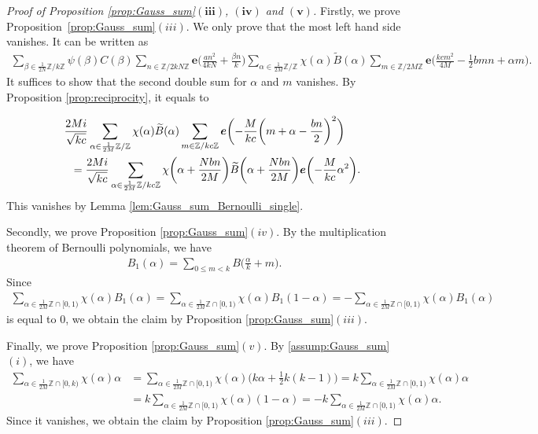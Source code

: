 \documentclass[11pt]{article}
\numberwithin{equation}{section}
\newcommand{\Z}{\mathbb{Z}}
\numberwithin{equation}{section}
\begin{document}
\begin{proof}[Proof of Proposition \ref{prop:Gauss_sum}${\boldsymbol{(iii)}}$, $\boldsymbol{(iv)}$ and $\boldsymbol{(v)}$]
	Firstly, we prove Proposition~\ref{prop:Gauss_sum}$(iii)$.
	We on\-ly prove that the most left hand side vanishes.
	It can be written as
	\begin{gather*}
		\sum_{\beta \in \frac{1}{2N}\Z/k\Z}\!\!\!\! \psi(\beta) C(\beta)\!\!\!
		\sum_{n \in \Z/2kN\Z}\!\!\! \!\bm{e}\bigg( \frac{an^2}{4kN} + \frac{\beta n}{k} \bigg)
	\!\!\!\sum_{\alpha \in \frac{1}{2M}\Z/\Z}\!\!\! \!\chi(\alpha) \widetilde{B}(\alpha)\!\!\!
\sum_{m \in \Z/2M\Z}\!\!\!\!\bm{e}\bigg( \frac{kcm^2}{4M} - \frac{1}{2}bmn + \alpha m \bigg).
	\end{gather*}
	It suffices to show that the second double sum for $ \alpha $ and $ m $ vanishes.
	By Proposition \ref{prop:reciprocity}, it equals to
	{\samepage\begin{gather*}
\frac{2M{\rm i}}{\sqrt{kc}}
		\sum_{\alpha \in \frac{1}{2M}\Z/\Z} \chi(\alpha) \widetilde{B}(\alpha)
		\sum_{m \in \Z/kc\Z} \bm{e}\bigg({-}\frac{M}{kc} \bigg( m + \alpha - \frac{bn}{2} \bigg)^2 \bigg)
\\ \qquad
	{}=	\frac{2M{\rm i}}{\sqrt{kc}}
		\sum_{\alpha \in \frac{1}{2M}\Z/kc\Z} \chi\bigg(\alpha + \frac{Nbn}{2M} \bigg) \widetilde{B}\bigg(\alpha + \frac{Nbn}{2M} \bigg)
		\bm{e}\bigg({-}\frac{M}{kc} \alpha^2 \bigg).
	\end{gather*}
	This vanishes by Lemma \ref{lem:Gauss_sum_Bernoulli_single}.

}
	
	Secondly, we prove Proposition \ref{prop:Gauss_sum}$(iv)$.
	By the multiplication theorem of Bernoulli polynomials, we have
	\begin{gather*}
	B_1(\alpha) = \sum_{0 \le m < k} B\bigg( \frac{\alpha}{k} + m \bigg).
	\end{gather*}
	Since
	\begin{gather*}
	\sum_{\alpha \in \frac{1}{2M}\Z \cap [0, 1)} \chi(\alpha) B_1(\alpha)
	= \sum_{\alpha \in \frac{1}{2M}\Z \cap [0, 1)} \chi(\alpha) B_1(1-\alpha)
	= -\sum_{\alpha \in \frac{1}{2M}\Z \cap [0, 1)} \chi(\alpha) B_1(\alpha)
	\end{gather*}
	is equal to $ 0 $, we obtain the claim by Proposition \ref{prop:Gauss_sum}$(iii)$.
	
	Finally, we prove Proposition \ref{prop:Gauss_sum}$(v)$.
	By \ref{assump:Gauss_sum}$(i)$, we have
	\begin{align*}
		\sum_{\alpha \in \frac{1}{2M}\Z \cap [0, k)} \chi(\alpha) \alpha		&=
\sum_{\alpha \in \frac{1}{2M}\Z \cap [0, 1)} \chi(\alpha) \bigg( k\alpha + \frac{1}{2}k(k-1) \bigg)
		= 		k \sum_{\alpha \in \frac{1}{2M}\Z \cap [0, 1)} \chi(\alpha) \alpha
\\
		&= k \sum_{\alpha \in \frac{1}{2M}\Z \cap [0, 1)} \chi(\alpha) ( 1 - \alpha )
		= -k \sum_{\alpha \in \frac{1}{2M}\Z \cap [0, 1)} \chi(\alpha) \alpha.
	\end{align*}
	Since it vanishes, we obtain the claim by Proposition \ref{prop:Gauss_sum}$(iii)$.
\end{proof}
\end{document}
